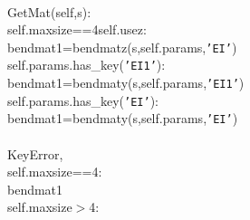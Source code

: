 {{\begin{tabbing}
\\
\hspace{5pt}GetMat(self,s):
\\
\hspace{5pt}self.maxsize==4\hspace{5pt}self.usez:
\\
\hspace{60pt}bendmat1=bendmatz(s,self.params,{\texttt{{'}EI{'}}})
\\
\hspace{5pt}self.params.has\_key({\texttt{{'}EI1{'}}}):
\\
\hspace{60pt}bendmat1=bendmaty(s,self.params,{\texttt{{'}EI1{'}}})
\\
\hspace{5pt}self.params.has\_key({\texttt{{'}EI{'}}}):
\\
\hspace{60pt}bendmat1=bendmaty(s,self.params,{\texttt{{'}EI{'}}})
\\
\\
\hspace{5pt}KeyError,\\
\hspace{5pt}self.maxsize==4:
\\
\hspace{5pt}bendmat1
\\
\hspace{5pt}self.maxsize$>$4:
\\

\end{tabbing}}}
